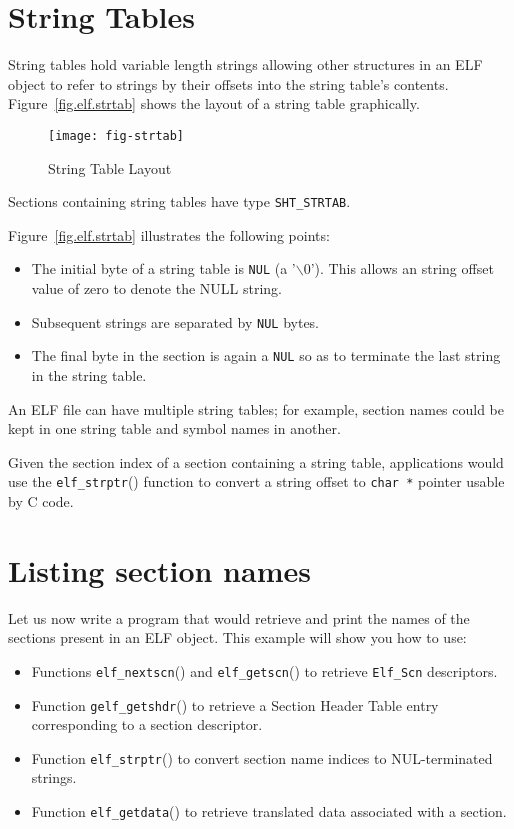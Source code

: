 \documentclass[a4paper]{book}
\newcommand{\constant}[1]{\texttt{#1}}
\newcommand{\function}[1]{\texttt{#1}()}
\newcommand{\type}[1]{\texttt{#1}}
\begin{document}
\section{String Tables}\label{sec.shdr.strtab}

String tables hold variable length strings allowing other structures
in an ELF object to refer to strings by their offsets into the string
table's contents. Figure~\vref{fig.elf.strtab} shows the layout of a
string table graphically.

\begin{figure}
  \begin{center}
    \texttt{[image: fig-strtab]}
  \end{center}
  \caption{String Table Layout}\label{fig.elf.strtab}
\end{figure}

Sections containing string tables have type \constant{SHT\_STRTAB}.

Figure~\vref{fig.elf.strtab} illustrates the following points:

\begin{itemize}
\item The initial byte of a string table is \constant{NUL} (a
  '\(\backslash\)0').  This allows an string offset value of zero to
  denote the NULL string.
\item Subsequent strings are separated by \constant{NUL} bytes.
\item The final byte in the section is again a \constant{NUL} so as to
  terminate the last string in the string table.
\end{itemize}

An ELF file can have multiple string tables; for example, section
names could be kept in one string table and symbol names in another.

Given the section index of a section containing a string table,
applications would use the \function{elf\_strptr} function to convert
a string offset to \type{char *} pointer usable by C code.

\section{Listing section names}
Let us now write a program that would retrieve and print the names of
the sections present in an ELF object.  This example will show you how
to use:
\begin{itemize}
\item Functions \function{elf\_nextscn} and \function{elf\_getscn} to
  retrieve \type{Elf\_Scn} descriptors.
\item Function \function{gelf\_getshdr} to retrieve a Section Header
  Table entry corresponding to a section descriptor.
\item Function \function{elf\_strptr} to convert section name indices
  to NUL-terminated strings.
\item Function \function{elf\_getdata} to retrieve translated data
  associated with a section.
\end{itemize}
\end{document}
